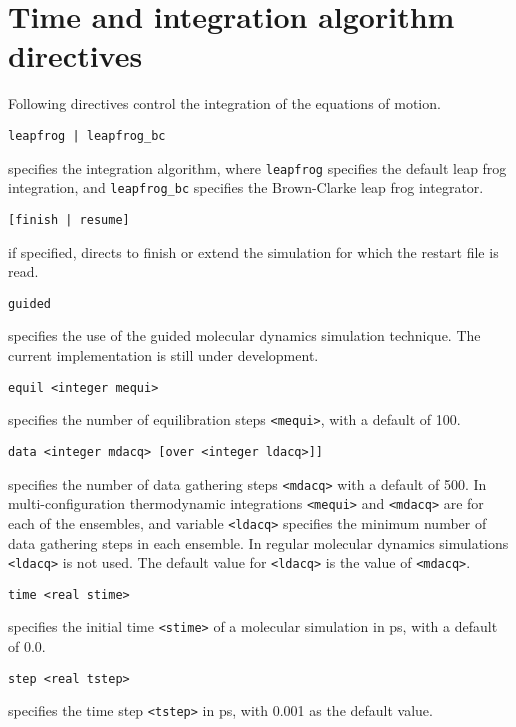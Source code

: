 \section{Time and integration algorithm directives}
Following directives control the integration of the equations of motion.
\begin{description}

\item
\begin{verbatim}
leapfrog | leapfrog_bc
\end{verbatim}
specifies the integration algorithm,
where {\tt leapfrog} specifies the default leap frog integration, and
{\tt leapfrog\_bc} specifies the Brown-Clarke leap frog integrator.

\item
\begin{verbatim}
[finish | resume]
\end{verbatim}
if specified, directs to finish or extend the simulation for which
the restart file is read.

\item
\begin{verbatim}
guided
\end{verbatim}
specifies the use of the guided molecular dynamics simulation
technique. The current implementation is still under development.

\item
\begin{verbatim}
equil <integer mequi>
\end{verbatim}
specifies the number of equilibration steps \verb+<mequi>+, with a default
of 100.

\item
\begin{verbatim}
data <integer mdacq> [over <integer ldacq>]]
\end{verbatim}
specifies the number of data gathering steps \verb+<mdacq>+ with a
default of 500. In multi-configuration thermodynamic integrations
\verb+<mequi>+ and \verb+<mdacq>+ are for each of the ensembles, and
variable \verb+<ldacq>+ specifies the minimum number of data gathering steps 
in each ensemble. In regular molecular dynamics simulations \verb+<ldacq>+
is not used. The default value for \verb+<ldacq>+ is the value of \verb+<mdacq>+.

\item
\begin{verbatim}
time <real stime>
\end{verbatim}
specifies the initial time \verb+<stime>+ of a molecular simulation in ps,
with a default of 0.0.

\item
\begin{verbatim}
step <real tstep>
\end{verbatim}
specifies the time step \verb+<tstep>+ in ps, with 0.001 as the default value.
\end{description}

